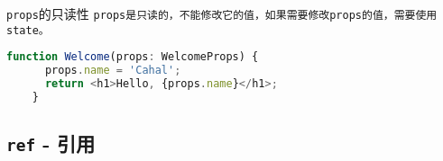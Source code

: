 \documentclass{beamer}
\begin{document}
\begin{frame}
  \framebreak

  \begin{alertblock}{\texttt{props}的只读性}
    \tt{props}是只读的，不能修改它的值，如果需要修改\tt{props}的值，需要使用\tt{state}。
  \end{alertblock}

  \begin{lstlisting}[language=JavaScript]
    function Welcome(props: WelcomeProps) {
      props.name = 'Cahal';
      return <h1>Hello, {props.name}</h1>;
    }
\end{lstlisting}



\end{frame}

\subsection{\texttt{ref} - 引用}
\end{document}

